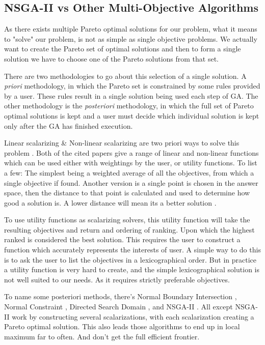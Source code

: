 \documentclass[11pt]{article}
\begin{document}
\subsection{NSGA-II vs Other Multi-Objective Algorithms}

    As there exists multiple Pareto optimal solutions for our problem, what it means to "solve"
    our problem, is not as simple as single objective problems. We actually want to create the
    Pareto set of optimal solutions and then to form a single solution we have to choose one of
    the Pareto solutions from that set.

    There are two methodologies to go about this selection of a single solution. A \textit{priori}
    methodology, in which the Pareto set is constrained by some rules provided by a user.
    These rules result in a single solution being used each step of GA. The other
    methodology is the \textit{posteriori} methodology, in which
    the full set of Pareto optimal solutions is kept and a user must decide which individual
    solution is kept only after the GA has finished execution.

    Linear scalarizing \& Non-linear scalarizing are two priori ways to solve this problem
    \cite{KaisaMarko, Moffaert}. Both of the cited papers give a range of linear and non-linear
    functions which can be used either with weightings by the user, or utility functions.
    To list a few: The simplest being a weighted average of all the objectives, from
    which a single objective if found. Another version is a single point is chosen
    in the answer space, then the distance to that point is calculated and used to
    determine how good a solution is. A lower distance will mean its a better solution
    \cite{Buchanan}.

    To use utility functions as scalarizing solvers, this utility function will take
    the resulting objectives and return and ordering of ranking. Upon which the highest
    ranked is considered the best solution. This requires the user to construct
    a function which accurately represents the interests of user. A simple way
    to do this is to ask the user to list the objectives in a lexicographical order.
    But in practice a utility function is very hard to create, and the simple
    lexicographical solution is not well suited to our needs. As it requires
    strictly preferable objectives.

    To name some posteriori methods, there's Normal Boundary Intersection \cite{Indraneel},
    Normal Constraint \cite{Messac}, Directed Search Domain \cite{Tohid}, and NSGA-II
    \cite{DebPratapAgarwalMeyarivan}. All except NSGA-II work by constructing several
    scalarizations, with each scalarization creating a Pareto optimal solution.
    This also leads those algorithms to end up in local maximum far to often. And
    don't get the full efficient frontier.
\end{document}
